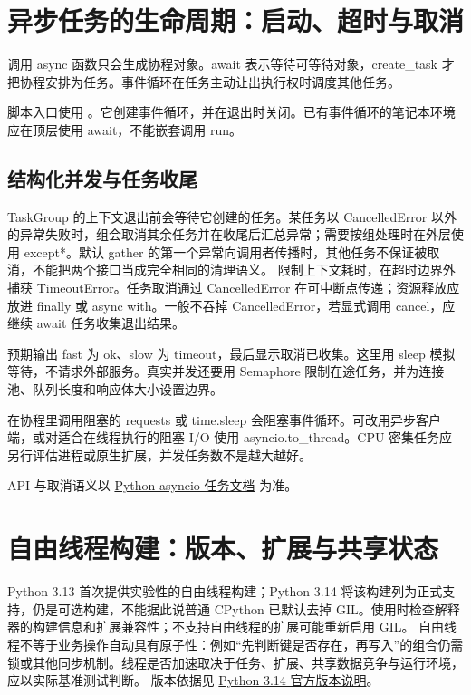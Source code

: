 \section{异步任务的生命周期：启动、超时与取消}\label{rev:python:async}
调用 async 函数只会生成协程对象。await 表示等待可等待对象，create\_task 才把协程安排为任务。事件循环在任务主动让出执行权时调度其他任务。

脚本入口使用 。它创建事件循环，并在退出时关闭。已有事件循环的笔记本环境应在顶层使用 await，不能嵌套调用 run。

\subsection{结构化并发与任务收尾}
TaskGroup 的上下文退出前会等待它创建的任务。某任务以 CancelledError 以外的异常失败时，组会取消其余任务并在收尾后汇总异常；需要按组处理时在外层使用 except*。默认 gather 的第一个异常向调用者传播时，其他任务不保证被取消，不能把两个接口当成完全相同的清理语义。
 限制上下文耗时，在超时边界外捕获 TimeoutError。任务取消通过 CancelledError 在可中断点传递；资源释放应放进 finally 或 async with。一般不吞掉 CancelledError，若显式调用 cancel，应继续 await 任务收集退出结果。

预期输出 fast 为 ok、slow 为 timeout，最后显示取消已收集。这里用 sleep 模拟等待，不请求外部服务。真实并发还要用 Semaphore 限制在途任务，并为连接池、队列长度和响应体大小设置边界。

\begin{pitfall}
在协程里调用阻塞的 requests 或 time.sleep 会阻塞事件循环。可改用异步客户端，或对适合在线程执行的阻塞 I/O 使用 asyncio.to\_thread。CPU 密集任务应另行评估进程或原生扩展，并发任务数不是越大越好。
\end{pitfall}
API 与取消语义以 \href{https://docs.python.org/3.11/library/asyncio-task.html}{Python asyncio 任务文档} 为准。

\section{自由线程构建：版本、扩展与共享状态}
Python 3.13 首次提供实验性的自由线程构建；Python 3.14 将该构建列为正式支持，仍是可选构建，不能据此说普通 CPython 已默认去掉 GIL。使用时检查解释器的构建信息和扩展兼容性；不支持自由线程的扩展可能重新启用 GIL。
自由线程不等于业务操作自动具有原子性：例如“先判断键是否存在，再写入”的组合仍需锁或其他同步机制。线程是否加速取决于任务、扩展、共享数据竞争与运行环境，应以实际基准测试判断。
版本依据见 \href{https://docs.python.org/3.14/whatsnew/3.14.html}{Python 3.14 官方版本说明}。
